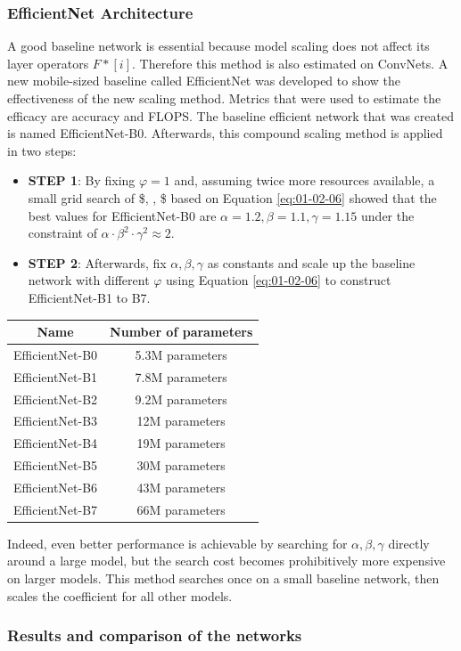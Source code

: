 \documentclass[
]{krantz}
\begin{document}
\hypertarget{efficientnet-architecture}{%
\subsubsection{EfficientNet Architecture}\label{efficientnet-architecture}}

A good baseline network is essential because model scaling does not affect its layer operators \(F*[i]\). Therefore this method is also estimated on ConvNets.
A new mobile-sized baseline called EfficientNet was developed to show the effectiveness of the new scaling method. Metrics that were used to estimate the efficacy are accuracy and FLOPS.
The baseline efficient network that was created is named EfficientNet-B0. Afterwards, this compound scaling method is applied in two steps:

\begin{itemize}
\item
  \textbf{STEP 1}: By fixing \(\varphi = 1\) and, assuming twice more resources available, a small grid search of \$\alpha, \beta, \gamma \$ based on Equation \eqref{eq:01-02-06} showed that the best values for EfficientNet-B0 are \(\alpha = 1.2, \beta = 1.1, \gamma=1.15\) under the constraint of \(\alpha·\beta^2·\gamma^2 ≈2\).
\item
  \textbf{STEP 2}: Afterwards, fix \(\alpha,\beta,\gamma\) as constants and scale up the baseline network with different \(\varphi\) using Equation \eqref{eq:01-02-06} to construct EfficientNet-B1 to B7.
\end{itemize}

\begin{longtable}[]{@{}cc@{}}
\toprule
Name & Number of parameters\tabularnewline
\midrule
\endhead
EfficientNet-B0 & 5.3M parameters\tabularnewline
EfficientNet-B1 & 7.8M parameters\tabularnewline
EfficientNet-B2 & 9.2M parameters\tabularnewline
EfficientNet-B3 & 12M parameters\tabularnewline
EfficientNet-B4 & 19M parameters\tabularnewline
EfficientNet-B5 & 30M parameters\tabularnewline
EfficientNet-B6 & 43M parameters\tabularnewline
EfficientNet-B7 & 66M parameters\tabularnewline
\bottomrule
\end{longtable}

Indeed, even better performance is achievable by searching for \(\alpha,\beta,\gamma\) directly around a large model, but the search cost becomes prohibitively more expensive on larger models. This method searches once on a small baseline network, then scales the coefficient for all other models.

\hypertarget{results-and-comparison-of-the-networks}{%
\subsubsection{Results and comparison of the networks}\label{results-and-comparison-of-the-networks}}
\end{document}
